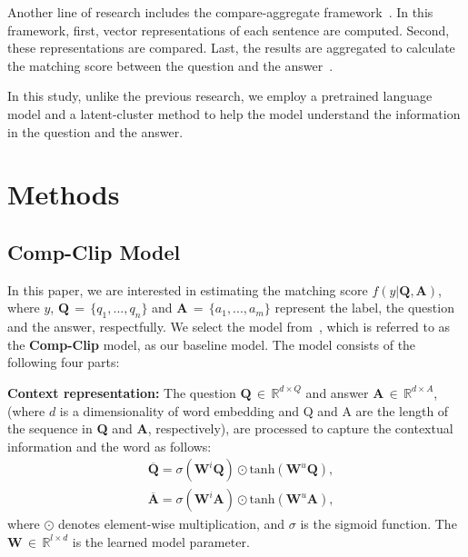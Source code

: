 \documentclass[sigconf]{acmart}
\begin{document}
Another line of research includes the compare-aggregate framework~\cite{wang2016compare}. 
In this framework, first, vector representations of each sentence are computed. Second, these representations are compared. Last, the results are aggregated to calculate the matching score between the question and the answer~\cite{bian2017compare,shen2017inter,tran2018context}. 

In this study, unlike the previous research, we employ a pretrained language model and a latent-cluster method to help the model understand the information in the question and the answer.


\section{Methods}
\label{sec:methods}

\subsection{Comp-Clip Model}
\label{ssec:compare_aggregate_model}
In this paper, we are interested in estimating the matching score $f(y|\textbf{Q},\textbf{A})$, where $y$, $\textbf{Q}\,{=}\,\{q_1, ...,q_n\}$ and $\textbf{A}\,{=}\,\{a_1, ..., a_m\}$ represent the label, the question and the answer, respectfully.
We select the model from~\cite{bian2017compare}, which is referred to as the \textbf{Comp-Clip} model, as our baseline model.
The model consists of the following four parts:

\vspace*{1mm}
\noindent\textbf{Context representation: }
The question $\textbf{Q}\,{\in}\,\mathbb{R}^{d\times Q}$ and answer $\textbf{A}\,{\in}\,\mathbb{R}^{d\times A}$, (where $d$ is a dimensionality of word embedding and Q and A are the length of the sequence in \textbf{Q} and \textbf{A}, respectively), are processed to capture the contextual information and the word as follows:
\begin{equation}
\begin{aligned}
& \overline{\textbf{Q}}=\sigma(\textbf{W}^i\textbf{Q})\odot \text{tanh}(\textbf{W}^u\textbf{Q}), \\
& \overline{\textbf{A}}=\sigma(\textbf{W}^i\textbf{A})\odot \text{tanh}(\textbf{W}^u\textbf{A}),
\end{aligned}
\label{eq:word-representation}
\end{equation}
where $\odot$ denotes element-wise multiplication, and $\sigma$ is the sigmoid function. The $\textbf{W}\,{\in}\,\mathbb{R}^{l\times d}$ is the learned model parameter.
\end{document}

